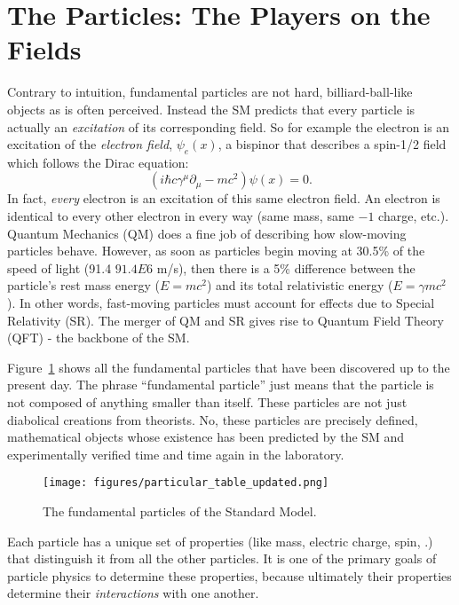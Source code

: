 
\section{The Particles: The Players on the Fields}

Contrary to intuition, fundamental particles are not hard, billiard-ball-like objects as is often perceived.
Instead the SM predicts that every particle is actually an \emph{excitation} of its corresponding field.
So for example the electron is an excitation of the \emph{electron field}, $\psi_{e}(x)$, a bispinor that describes a spin-1/2 field which follows the Dirac equation: 
\begin{equation*}
    (i\hbar c \gamma^{\mu}{\partial}_{\mu} 
    - mc^{2})\psi(x) = 0.
\end{equation*}
In fact, \emph{every} electron is an excitation of this same electron field. 
An electron is identical to every other electron in every way (same mass, same $-1$ charge, etc.).
Quantum Mechanics (QM) does a fine job of describing how slow-moving particles behave.
However, as soon as particles begin moving at 30.5\% of the speed of light (91.4 $91.4 E6$ m/s), then there is a 5\% difference between the particle's rest mass energy ($E = mc^2$) and its total relativistic energy ($E = \gamma mc^2$).
In other words, fast-moving particles must account for effects due to Special Relativity (SR).
The merger of QM and SR gives rise to Quantum Field Theory (QFT) - the backbone of the SM.

Figure~\ref{fig:particulartable} shows all the fundamental particles that have been discovered up to the present day.
The phrase ``fundamental particle'' just means that the particle is not composed of anything smaller than itself. 
These particles are not just diabolical creations from theorists. 
No, these particles are precisely defined, mathematical objects whose existence has been predicted by the SM and experimentally verified time and time again in the laboratory.
\begin{figure}[pbth]
\centering
\texttt{[image: figures/particular\_table\_updated.png]}
    \caption{The fundamental particles of the Standard Model.} 
    \label{fig:particulartable}
\end{figure}

Each particle has a unique set of properties (like mass, electric charge, spin, \etc.) that distinguish it from all the other particles. 
It is one of the primary goals of particle physics to determine these properties, because ultimately their properties determine their \emph{interactions} with one another. 

